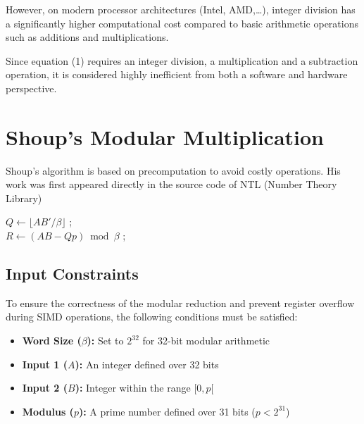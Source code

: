 \documentclass{article}
\begin{document}
However, on modern processor architectures (Intel, AMD,\dots), integer division has a significantly higher computational cost compared to basic arithmetic operations such as additions and multiplications.

Since equation (1) requires an integer division, a multiplication and a subtraction operation, it is considered highly inefficient from both a software and hardware perspective.



\section{Shoup's Modular Multiplication}
Shoup's algorithm is based on precomputation to avoid costly operations. His work was first appeared directly in the source code of NTL (Number Theory Library)\cite{shoupNTL}

\begin{algorithm}[H]
    \caption{Shoup's modular multiplication algorithm}


    \Input{$A, B \in [0, p[$, we suppose that $p < \beta$/2 \\
    \hspace{1.2cm} precompute $B' = \lfloor B\beta/p \rfloor$}

    \BlankLine

    $Q \leftarrow \lfloor AB'/\beta \rfloor$ \quad ;\\
    $R \leftarrow (AB - Qp) \bmod \beta$ \quad ;

\end{algorithm}


\subsection{Input Constraints}
To ensure the correctness of the modular reduction and prevent register overflow during SIMD operations,
the following conditions must be satisfied:
\begin{itemize}
    \item \textbf{Word Size ($\beta$):} Set to $2^{32}$ for 32-bit modular arithmetic
    \item \textbf{Input 1 ($A$):} An integer defined over 32 bits
    \item \textbf{Input 2 ($B$):} Integer within the range $[0, p[$
    \item \textbf{Modulus ($p$):} A prime number defined over 31 bits ($p < 2^{31}$)
\end{itemize}
\end{document}
